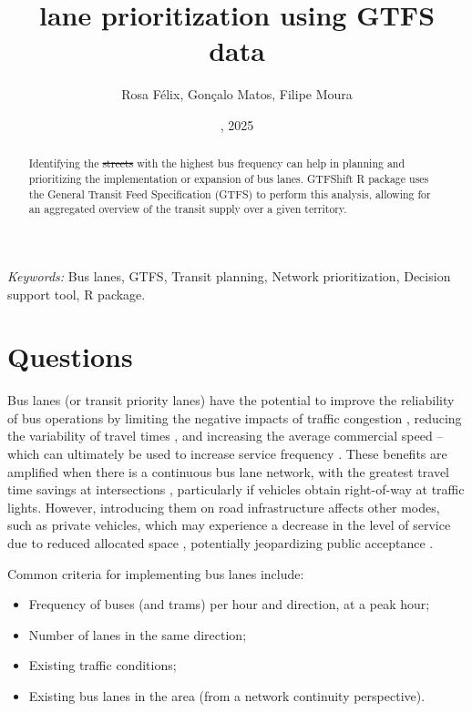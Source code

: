 \documentclass[
]{article}
\title{\DIFdelbegin \DIFdel{Bus }\DIFdelend \DIFaddbegin \DIFadd{GTFShift for bus }\DIFaddend lane prioritization using GTFS \DIFaddbegin \DIFadd{and OSM }\DIFaddend data}
\author{Rosa Félix, Gonçalo Matos, Filipe Moura}
\date{\DIFdelbegin \DIFdel{May 18}\DIFdelend \DIFaddbegin \DIFadd{Aug 11}\DIFaddend , 2025}
\providecommand{\tightlist}{%
  \setlength{\itemsep}{0pt}\setlength{\parskip}{0pt}}
\providecommand{\DIFadd}[1]{{\protect\color{green}{#1}}} %
\providecommand{\DIFdel}[1]{{\protect\color{red}\sout{#1}}}                      %
\providecommand{\DIFaddbegin}{} %
\providecommand{\DIFaddend}{} %
\providecommand{\DIFdelbegin}{} %
\providecommand{\DIFdelend}{} %
\newcommand{\DIFscaledelfig}{0.5}
\newlength{\DIFdelgraphicswidth} %
\newlength{\DIFdelgraphicsheight} %
\newcommand{\DIFaddincludegraphics}[2][]{{\color{blue}\fbox{\DIFOincludegraphics[#1]{#2}}}} %
\newcommand{\DIFdelincludegraphics}[2][]{%
\sbox{\DIFdelgraphicsbox}{\DIFOincludegraphics[#1]{#2}}%
\settoboxwidth{\DIFdelgraphicswidth}{\DIFdelgraphicsbox} %
\settoboxtotalheight{\DIFdelgraphicsheight}{\DIFdelgraphicsbox} %
\scalebox{\DIFscaledelfig}{%
\parbox[b]{\DIFdelgraphicswidth}{\usebox{\DIFdelgraphicsbox}\\[-\baselineskip] \rule{\DIFdelgraphicswidth}{0em}}\llap{\resizebox{\DIFdelgraphicswidth}{\DIFdelgraphicsheight}{%
\setlength{\unitlength}{\DIFdelgraphicswidth}%
\begin{picture}(1,1)%
\thicklines\linethickness{2pt} %
{\color[rgb]{1,0,0}\put(0,0){\framebox(1,1){}}}%
{\color[rgb]{1,0,0}\put(0,0){\line( 1,1){1}}}%
{\color[rgb]{1,0,0}\put(0,1){\line(1,-1){1}}}%
\end{picture}%
}\hspace*{3pt}}} %
} %
\DeclareRobustCommand{\DIFaddbegin}{\DIFOaddbegin \let\includegraphics\DIFaddincludegraphics} %
\DeclareRobustCommand{\DIFaddend}{\DIFOaddend \let\includegraphics\DIFOincludegraphics} %
\DeclareRobustCommand{\DIFdelbegin}{\DIFOdelbegin \let\includegraphics\DIFdelincludegraphics} %
\DeclareRobustCommand{\DIFdelend}{\DIFOaddend \let\includegraphics\DIFOincludegraphics} %
\begin{document}
\maketitle
\begin{abstract}
Identifying the \DIFdelbegin \DIFdel{streets }\DIFdelend \DIFaddbegin \DIFadd{road network segments }\DIFaddend with the highest bus frequency \DIFaddbegin \DIFadd{per hour }\DIFaddend can help in planning and prioritizing the implementation or expansion of bus lanes. GTFShift R package uses the General Transit Feed Specification (GTFS) to perform this analysis, allowing for an aggregated overview of the transit supply over a given territory.
\end{abstract}

\textit{Keywords:} Bus lanes, GTFS, Transit planning, Network prioritization, Decision support tool, R package.

\section{Questions}\label{questions}

Bus lanes (or transit priority lanes) have the potential to improve the reliability of bus operations by limiting the negative impacts of traffic congestion \citep{cesme2018}, reducing the variability of travel times \citep{surprenant-legault-2011}, and increasing the average commercial speed -- which can ultimately be used to increase service frequency \citep{basso-2011}.
These benefits are amplified when there is a continuous bus lane network, with the greatest travel time savings at intersections \citep{truong-2015}, particularly if vehicles obtain right-of-way at traffic lights.
However, introducing them on road infrastructure affects other modes, such as private vehicles, which may experience a decrease in the level of service due to reduced allocated space \citep{arasan-2010}, potentially jeopardizing public acceptance \citep{batty-2014}.

Common criteria for implementing bus lanes include:

\begin{itemize}
\tightlist
\item
  Frequency of buses (and trams) per hour and direction, at a peak hour;
\item
  Number of lanes in the same direction;
\item
  Existing traffic conditions;
\item
  Existing bus lanes in the area (from a network continuity perspective).
\end{itemize}
\end{document}
